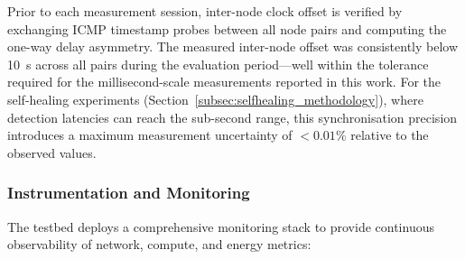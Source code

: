 Prior to each measurement session, inter-node clock offset is
verified by exchanging ICMP timestamp probes between all node pairs
and computing the one-way delay asymmetry.
The measured inter-node offset was consistently below 10~\textmu s
across all pairs during the evaluation period---well within the
tolerance required for the millisecond-scale measurements reported
in this work.
For the self-healing experiments (Section~\ref{subsec:selfhealing_methodology}),
where detection latencies can reach the sub-second range, this
synchronisation precision introduces a maximum measurement
uncertainty of $<\!0.01\%$ relative to the observed values.

\subsubsection{Instrumentation and Monitoring}
\label{subsubsec:instrumentation}

The testbed deploys a comprehensive monitoring stack to provide
continuous observability of network, compute, and energy metrics:

